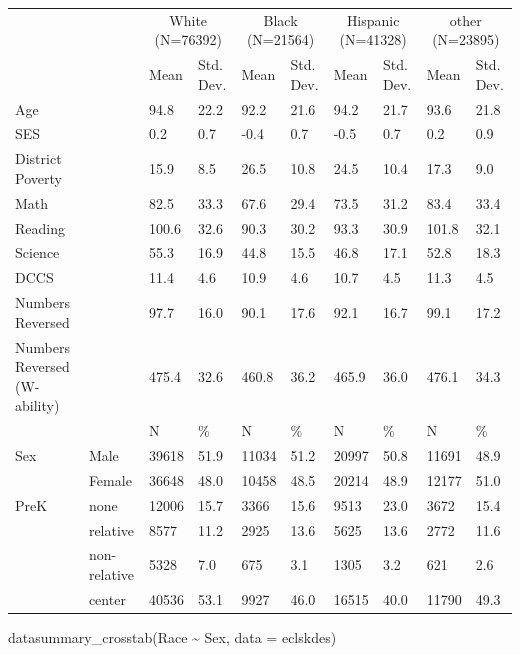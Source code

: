 \documentclass[
]{article}
\newenvironment{Shaded}{\begin{snugshade}}{\end{snugshade}}
\newcommand{\AttributeTok}[1]{\textcolor[rgb]{0.77,0.63,0.00}{#1}}
\newcommand{\FunctionTok}[1]{\textcolor[rgb]{0.00,0.00,0.00}{#1}}
\newcommand{\NormalTok}[1]{#1}
\newcommand{\SpecialCharTok}[1]{\textcolor[rgb]{0.00,0.00,0.00}{#1}}
\begin{document}
\begin{table}
\centering
\begin{tabular}[t]{llllllllll}
\toprule
\multicolumn{2}{c}{ } & \multicolumn{2}{c}{White (N=76392)} & \multicolumn{2}{c}{Black (N=21564)} & \multicolumn{2}{c}{Hispanic (N=41328)} & \multicolumn{2}{c}{other (N=23895)} \\
\cmidrule(l{3pt}r{3pt}){3-4} \cmidrule(l{3pt}r{3pt}){5-6} \cmidrule(l{3pt}r{3pt}){7-8} \cmidrule(l{3pt}r{3pt}){9-10}
  &    & Mean & Std. Dev. & Mean  & Std. Dev.  & Mean   & Std. Dev.   & Mean    & Std. Dev.   \\
\midrule
Age &  & 94.8 & 22.2 & 92.2 & 21.6 & 94.2 & 21.7 & 93.6 & 21.8\\
SES &  & 0.2 & 0.7 & -0.4 & 0.7 & -0.5 & 0.7 & 0.2 & 0.9\\
District Poverty &  & 15.9 & 8.5 & 26.5 & 10.8 & 24.5 & 10.4 & 17.3 & 9.0\\
Math &  & 82.5 & 33.3 & 67.6 & 29.4 & 73.5 & 31.2 & 83.4 & 33.4\\
Reading &  & 100.6 & 32.6 & 90.3 & 30.2 & 93.3 & 30.9 & 101.8 & 32.1\\
Science &  & 55.3 & 16.9 & 44.8 & 15.5 & 46.8 & 17.1 & 52.8 & 18.3\\
DCCS &  & 11.4 & 4.6 & 10.9 & 4.6 & 10.7 & 4.5 & 11.3 & 4.5\\
Numbers Reversed &  & 97.7 & 16.0 & 90.1 & 17.6 & 92.1 & 16.7 & 99.1 & 17.2\\
Numbers Reversed (W-ability) &  & 475.4 & 32.6 & 460.8 & 36.2 & 465.9 & 36.0 & 476.1 & 34.3\\
\midrule
 &  & N & \% & N & \% & N & \% & N & \%\\
Sex & Male & 39618 & 51.9 & 11034 & 51.2 & 20997 & 50.8 & 11691 & 48.9\\
 & Female & 36648 & 48.0 & 10458 & 48.5 & 20214 & 48.9 & 12177 & 51.0\\
PreK & none & 12006 & 15.7 & 3366 & 15.6 & 9513 & 23.0 & 3672 & 15.4\\
 & relative & 8577 & 11.2 & 2925 & 13.6 & 5625 & 13.6 & 2772 & 11.6\\
 & non-relative & 5328 & 7.0 & 675 & 3.1 & 1305 & 3.2 & 621 & 2.6\\
 & center & 40536 & 53.1 & 9927 & 46.0 & 16515 & 40.0 & 11790 & 49.3\\
\bottomrule
\end{tabular}
\end{table}

\begin{Shaded}
\begin{Highlighting}[]
\FunctionTok{datasummary\_crosstab}\NormalTok{(Race }\SpecialCharTok{\textasciitilde{}}\NormalTok{ Sex, }\AttributeTok{data =}\NormalTok{ eclskdes)}
\end{Highlighting}
\end{Shaded}
\end{document}

